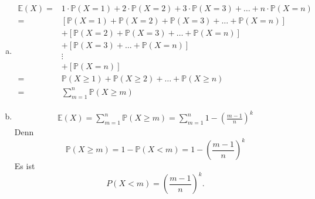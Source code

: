 \documentclass{article}
\newcommand{\E}{\mathbb{E}}
\renewcommand{\P}{\mathbb{P}}
\begin{document}
\begin{enumerate}[a)]
        \item
            \begin{align*}
                \E(X)
                =&1\cdot\P(X=1)+2\cdot\P(X=2)+3\cdot\P(X=3)
                +\hdots+n\cdot\P(X=n)\\
                =&\left[\P(X=1)+\P(X=2)+\P(X=3)+\hdots+\P(X=n)\right]\\
                &+\left[\P(X=2)+\P(X=3)+\hdots+\P(X=n)\right]\\
                &+\left[\P(X=3)+\hdots+\P(X=n)\right]\\
                &\vdots\\
                &+\left[\P(X=n)\right]\\
                =&\P(X\geq 1)+\P(X\geq 2)+\hdots+\P(X\geq n)\\
                =&\sum_{m=1}^{n}\P(X\geq m)
            \end{align*}
        \item
            \begin{align*}
                \E(X)=\sum_{m=1}^n\P(X\geq m)=
                \sum_{m=1}^n 1-\left(\frac{m-1}{n}\right)^k
            \end{align*}
            Denn
            \begin{equation*}
                \P(X\geq m)=1-\P(X<m)=1-\left(\frac{m-1}{n}\right)^k
            \end{equation*}
            Es ist
            \begin{equation*}
                P(X<m)=\left(\frac{m-1}{n}\right)^k.
            \end{equation*}
    \end{enumerate}
\end{document}
